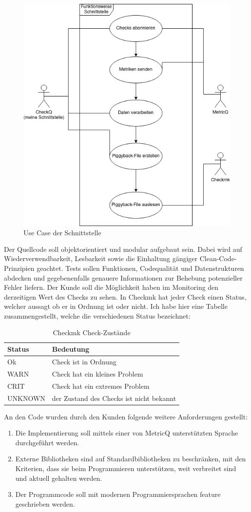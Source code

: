 \begin{figure}[H]
  \centering
  \includegraphics[height=0.5\textwidth]{images/use-case-checkq.png}
  \caption{Use Case der Schnittstelle}
\end{figure}

\noindent
Der Quellcode soll objektorientiert und modular aufgebaut sein. Dabei wird auf Wiederverwendbarkeit, Lesbarkeit sowie die Einhaltung gängiger Clean-Code-Prinzipien geachtet.
Tests sollen Funktionen, Codequalität und Datenstrukturen abdecken und gegebenenfalls genauere Informationen zur Behebung potenzieller Fehler liefern.
Der Kunde soll die Möglichkeit haben im Monitoring den derzeitigen Wert des Checks zu sehen.
In \Gls{Checkmk} hat jeder Check einen Status, welcher aussagt ob er in Ordnung ist oder nicht.
Ich habe hier eine Tabelle zusammengestellt, welche die verschiedenen Status bezeichnet:

\begin{table}[H]
  \centering
  \begin{tabular}{l l}
    \hline
    \textbf{Status} & \textbf{Bedeutung} \\
    \hline
    Ok     & Check ist in Ordnung \\
    WARN   & Check hat ein kleines Problem \\
    CRIT   & Check hat ein extremes Problem \\
    UNKNOWN & der Zustand des Checks ist nicht bekannt \\
  \end{tabular}
  \caption{Checkmk Check-Zustände}
\end{table}

\noindent
An den Code wurden durch den Kunden folgende weitere Anforderungen gestellt:

\begin{enumerate}
  \item Die Implementierung soll mittels einer von \Gls{MetricQ} unterstützten Sprache durchgeführt werden.
  \item Externe Bibliotheken sind auf Standardbibliotheken zu beschränken, mit den Kriterien, dass sie beim
    Programmieren unterstützen, weit verbreitet sind und aktuell gehalten werden.
  \item Der Programmcode soll mit modernen Programmiersprachen \Gls{feature} geschrieben werden.
\end{enumerate}

